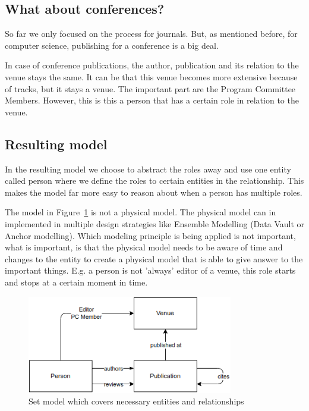 \documentclass{ou-report}
\begin{document}
\subsection{What about conferences?}
So far we only focused on the process for journals. But, as mentioned before, 
for computer science, publishing for a conference is a big deal.

In case of conference publications, the author, publication and its relation to 
the venue stays the same. It can be that this venue becomes more extensive 
because of tracks, but it stays a venue.
The important part are the Program Committee Members. However, this is this a 
person that has a certain role in relation to the venue.

\subsection{Resulting model}
In the resulting model we choose to abstract the roles away and use one entity 
called person where we define the roles to certain entities in the relationship. 
This makes the model far more easy to reason about when a person has multiple 
roles.

The model in Figure~\ref{fig:resulting_model} is not a physical model. The 
physical model can in implemented in multiple design strategies like Ensemble 
Modelling (Data Vault or Anchor modelling). Which modeling principle is being 
applied is not important, what is important, is that the physical model needs to 
be aware of time and changes to the entity to create a physical model that is 
able to give answer to the important things. E.g. a person is not 'always' 
editor of a venue, this role starts and stops at a certain moment in time.
\begin{figure}[H]
\centering
\includegraphics[width=9cm]{images/set_model.png}
\caption{Set model which covers necessary entities and relationships}
\label{fig:resulting_model}
\end{figure}
\end{document}

